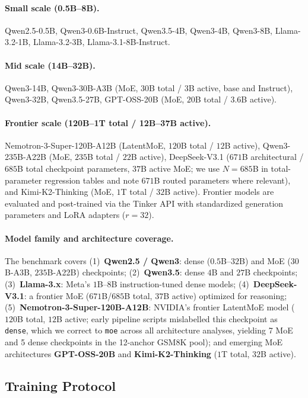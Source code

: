 \paragraph{Small scale (0.5B--8B).}
Qwen2.5-0.5B, Qwen3-0.6B-Instruct, Qwen3.5-4B, Qwen3-4B, Qwen3-8B,
Llama-3.2-1B, Llama-3.2-3B, Llama-3.1-8B-Instruct.

\paragraph{Mid scale (14B--32B).}
Qwen3-14B, Qwen3-30B-A3B (MoE, $30$B total / $3$B active, base and Instruct), Qwen3-32B, Qwen3.5-27B,
GPT-OSS-20B (MoE, $20$B total / $3.6$B active).

\paragraph{Frontier scale (120B--1T total / 12B--37B active).}
Nemotron-3-Super-120B-A12B (LatentMoE, $120$B total / $12$B active), Qwen3-235B-A22B (MoE, $235$B total / $22$B active), DeepSeek-V3.1 ($671$B architectural / $685$B total checkpoint parameters, $37$B active MoE; we use $N=685$B in total-parameter regression tables and note $671$B routed parameters where relevant), and Kimi-K2-Thinking (MoE, $1$T total / $32$B active).
Frontier models are evaluated and post-trained via the Tinker API
with standardized generation parameters and LoRA adapters ($r=32$).

\paragraph{Model family and architecture coverage.}
The benchmark covers (1)~\textbf{Qwen2.5 / Qwen3}: dense ($0.5$B--$32$B) and MoE ($30$B-A3B, $235$B-A22B) checkpoints;
(2)~\textbf{Qwen3.5}: dense $4$B and $27$B checkpoints;
(3)~\textbf{Llama-3.x}: Meta's $1$B--$8$B instruction-tuned dense models;
(4)~\textbf{DeepSeek-V3.1}: a frontier MoE ($671$B/$685$B total, $37$B active) optimized for reasoning;
(5)~\textbf{Nemotron-3-Super-120B-A12B}: NVIDIA's frontier LatentMoE model ($120$B total, $12$B active; early pipeline scripts mislabelled this checkpoint as \texttt{dense}, which we correct to \texttt{moe} across all architecture analyses, yielding 7 MoE and 5 dense checkpoints in the 12-anchor GSM8K pool);
and emerging MoE architectures \textbf{GPT-OSS-20B} and \textbf{Kimi-K2-Thinking} ($1$T total, $32$B active).

\subsection{Training Protocol}

